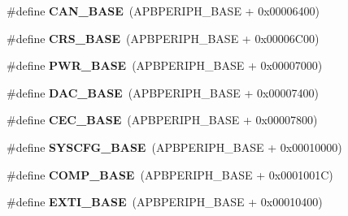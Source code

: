 \begin{DoxyCompactItemize}
\item 
\mbox{\label{group___peripheral__memory__map_gacbe030cda8eb3031d55a759612a9042d}} 
\#define {\bfseries C\+A\+N\+\_\+\+B\+A\+SE}~(A\+P\+B\+P\+E\+R\+I\+P\+H\+\_\+\+B\+A\+SE + 0x00006400)
\item 
\mbox{\label{group___peripheral__memory__map_ga53cd25310ec0663a7395042bd860fedc}} 
\#define {\bfseries C\+R\+S\+\_\+\+B\+A\+SE}~(A\+P\+B\+P\+E\+R\+I\+P\+H\+\_\+\+B\+A\+SE + 0x00006\+C00)
\item 
\mbox{\label{group___peripheral__memory__map_gac691ec23dace8b7a649a25acb110217a}} 
\#define {\bfseries P\+W\+R\+\_\+\+B\+A\+SE}~(A\+P\+B\+P\+E\+R\+I\+P\+H\+\_\+\+B\+A\+SE + 0x00007000)
\item 
\mbox{\label{group___peripheral__memory__map_gad18d0b914c7f68cecbee1a2d23a67d38}} 
\#define {\bfseries D\+A\+C\+\_\+\+B\+A\+SE}~(A\+P\+B\+P\+E\+R\+I\+P\+H\+\_\+\+B\+A\+SE + 0x00007400)
\item 
\mbox{\label{group___peripheral__memory__map_gaacb77bc44b3f8c87ab98f241e760e440}} 
\#define {\bfseries C\+E\+C\+\_\+\+B\+A\+SE}~(A\+P\+B\+P\+E\+R\+I\+P\+H\+\_\+\+B\+A\+SE + 0x00007800)
\item 
\mbox{\label{group___peripheral__memory__map_ga62246020bf3b34b6a4d8d0e84ec79d3d}} 
\#define {\bfseries S\+Y\+S\+C\+F\+G\+\_\+\+B\+A\+SE}~(A\+P\+B\+P\+E\+R\+I\+P\+H\+\_\+\+B\+A\+SE + 0x00010000)
\item 
\mbox{\label{group___peripheral__memory__map_gaa9f5d2999c6918e385d7a526c4f6b1d3}} 
\#define {\bfseries C\+O\+M\+P\+\_\+\+B\+A\+SE}~(A\+P\+B\+P\+E\+R\+I\+P\+H\+\_\+\+B\+A\+SE + 0x0001001\+C)
\item 
\mbox{\label{group___peripheral__memory__map_ga87371508b3bcdcd98cd1ec629be29061}} 
\#define {\bfseries E\+X\+T\+I\+\_\+\+B\+A\+SE}~(A\+P\+B\+P\+E\+R\+I\+P\+H\+\_\+\+B\+A\+SE + 0x00010400)
\item 
\mbox{\label{group___peripheral__memory__map_gade4d3907fd0387ee832f426f52d568bb}} 

\end{DoxyCompactItemize}
